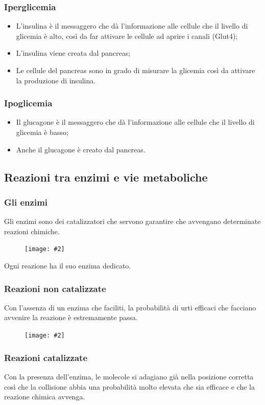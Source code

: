 \documentclass{article}
\newcommand{\cfig}[2]{
    \phantom{}
    \begin{figure}[ht!]
        \begin{center}
            \texttt{[image: \#2]}
        \end{center}
    \end{figure}
}
\begin{document}
\subsubsection{Iperglicemia}
\begin{itemize}
    \item L'insulina è il messaggero che dà l'informazione alle cellule che il livello di
        glicemia è alto, così da far attivare le cellule ad aprire i canali (Glut4);
    \item L'insulina viene creata dal pancreas;
    \item Le cellule del pancreas sono in grado di misurare la glicemia così da attivare la
        produzione di insulina.
\end{itemize}

\subsubsection{Ipoglicemia}
\begin{itemize}
    \item Il glucagone è il messaggero che dà l'informazione alle cellule che il livello di
        glicemia è basso;
    \item Anche il glucagone è creato dal pancreas.
\end{itemize}

\subsection{Reazioni tra enzimi e vie metaboliche}
\subsubsection{Gli enzimi}
Gli enzimi sono dei catalizzatori che servono garantire che avvengano determinate reazioni
chimiche.

\cfig{.6}{media/enzimi.png}

Ogni reazione ha il suo enzima dedicato.

\subsubsection{Reazioni non catalizzate}
Con l'assenza di un enzima che faciliti, la probabilità di urti efficaci che facciano avvenire
la reazione è estremamente passa.

\cfig{.75}{media/uncat.png}

\subsubsection{Reazioni catalizzate}
Con la presenza dell'enzima, le molecole si adagiano già nella posizione corretta così che
la collisione abbia una probabilità molto elevata che sia efficace e che la reazione chimica
avvenga.
\end{document}
